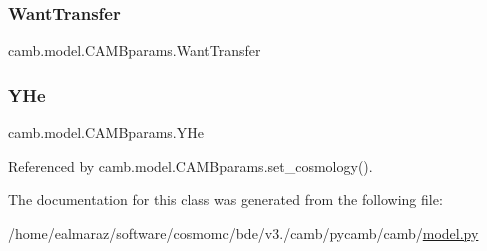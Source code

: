 \subsubsection{\texorpdfstring{Want\+Transfer}{WantTransfer}}
{\footnotesize\ttfamily camb.\+model.\+C\+A\+M\+Bparams.\+Want\+Transfer}

\mbox{\label{classcamb_1_1model_1_1CAMBparams_a54a670bce83f5d6598fba3d39ab0b122}} 
\subsubsection{\texorpdfstring{Y\+He}{YHe}}
{\footnotesize\ttfamily camb.\+model.\+C\+A\+M\+Bparams.\+Y\+He}



Referenced by camb.\+model.\+C\+A\+M\+Bparams.\+set\+\_\+cosmology().



The documentation for this class was generated from the following file\+:\begin{DoxyCompactItemize}
\item 
/home/ealmaraz/software/cosmomc/bde/v3./camb/pycamb/camb/\mbox{\hyperlink{model_8py}{model.\+py}}\end{DoxyCompactItemize}
